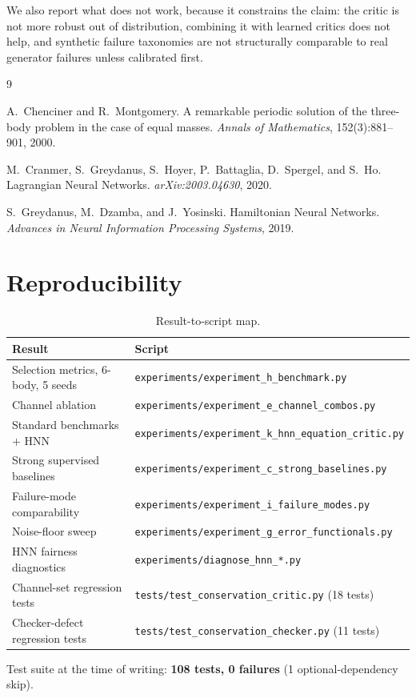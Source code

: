 \documentclass[11pt]{article}
\begin{document}
We also report what does not work, because it constrains the claim: the critic is not
more robust out of distribution, combining it with learned critics does not help, and
synthetic failure taxonomies are not structurally comparable to real generator failures
unless calibrated first.

\begin{thebibliography}{9}

A.~Chenciner and R.~Montgomery.
\newblock A remarkable periodic solution of the three-body problem in the case of equal
masses.
\newblock \emph{Annals of Mathematics}, 152(3):881--901, 2000.

M.~Cranmer, S.~Greydanus, S.~Hoyer, P.~Battaglia, D.~Spergel, and S.~Ho.
\newblock Lagrangian Neural Networks.
\newblock \emph{arXiv:2003.04630}, 2020.

S.~Greydanus, M.~Dzamba, and J.~Yosinski.
\newblock Hamiltonian Neural Networks.
\newblock \emph{Advances in Neural Information Processing Systems}, 2019.

\end{thebibliography}

\appendix

\section{Reproducibility}

\begin{table}[h]
\centering
\small
\caption{Result-to-script map.}
\label{tab:repro}
\begin{tabular}{ll}
\toprule
Result & Script \\
\midrule
Selection metrics, 6-body, 5 seeds & \texttt{experiments/experiment\_h\_benchmark.py} \\
Channel ablation & \texttt{experiments/experiment\_e\_channel\_combos.py} \\
Standard benchmarks $+$ HNN & \texttt{experiments/experiment\_k\_hnn\_equation\_critic.py} \\
Strong supervised baselines & \texttt{experiments/experiment\_c\_strong\_baselines.py} \\
Failure-mode comparability & \texttt{experiments/experiment\_i\_failure\_modes.py} \\
Noise-floor sweep & \texttt{experiments/experiment\_g\_error\_functionals.py} \\
HNN fairness diagnostics & \texttt{experiments/diagnose\_hnn\_*.py} \\
Channel-set regression tests & \texttt{tests/test\_conservation\_critic.py} (18 tests) \\
Checker-defect regression tests & \texttt{tests/test\_conservation\_checker.py} (11 tests) \\
\bottomrule
\end{tabular}
\end{table}

Test suite at the time of writing: \textbf{108 tests, 0 failures} (1 optional-dependency
skip).
\end{document}
